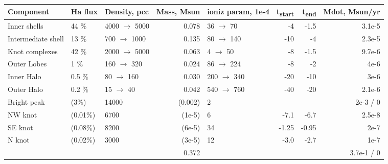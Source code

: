 \begin{tabular}{lllrlrrr}
Component & Ha flux & Density, pcc & Mass, Msun & ioniz param, 1e-4 & t\textsubscript{start} & t\textsubscript{end} & Mdot, Msun/yr\\
\hline
Inner shells & 44 \% & 4000 \(\to\) 5000 & 0.078 & 36 \(\to\) 70 & -4 & -1.5 & 3.1e-5\\
Intermediate shell & 13 \% & 700 \(\to\) 1000 & 0.135 & 80 \(\to\) 140 & -10 & -4 & 2.3e-5\\
Knot complexes & 42 \% & 2000 \(\to\) 5000 & 0.063 & 4 \(\to\) 50 & -8 & -1.5 & 9.7e-6\\
Outer Lobes & 1 \% & 160 \(\to\) 320 & 0.024 & 86 \(\to\) 224 & -8 & -2 & 4e-6\\
\hline
Inner Halo & 0.5 \% & 80 \(\to\) 160 & 0.030 & 200 \(\to\) 340 & -20 & -10 & 3e-6\\
Outer Halo & 0.2 \% & 15 \(\to\) 40 & 0.042 & 540 \(\to\) 760 & -40 & -20 & 2.1e-6\\
\hline
Bright peak & (3\%) & 14000 & (0.002) & 2 &  &  & 2e-3 / 0\\
NW knot & (0.01\%) & 6700 & (1e-5) & 6 & -7.1 & -6.7 & 2.5e-8\\
SE knot & (0.08\%) & 8200 & (6e-5) & 34 & -1.25 & -0.95 & 2e-7\\
N knot & (0.02\%) & 3000 & (3e-5) & 12 & -3.0 & -2.7 & 1e-7\\
\hline
 &  &  & 0.372 &  &  &  & 3.7e-1 / 0\\
\end{tabular}
